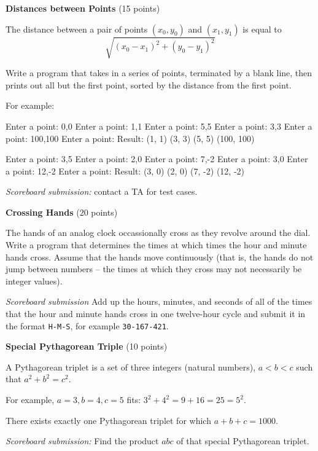 \documentclass[11pt]{cselabheader}
\theoremstyle{plain}
\begin{document}
\begin{prob}[distances.py]
    \textbf{Distances between Points} (15 points)

    The distance between a pair of points $(x_0, y_0)$ and $(x_1, y_1)$ is
    equal to $$\sqrt{(x_0 - x_1)^2 + (y_0 - y_1)^2}$$
    
    Write a program that takes in a series of points, terminated by a blank
    line, then prints out all but the first point, sorted by the distance from
    the first point.
    
    For example:
    
    \begin{verbatimcode}
Enter a point: 0,0
Enter a point: 1,1
Enter a point: 5,5
Enter a point: 3,3
Enter a point: 100,100
Enter a point:
Result: (1, 1) (3, 3) (5, 5) (100, 100)
    \end{verbatimcode}
    
    \begin{verbatimcode}
Enter a point: 3,5
Enter a point: 2,0
Enter a point: 7,-2
Enter a point: 3,0
Enter a point: 12,-2
Enter a point: 
Result: (3, 0) (2, 0) (7, -2) (12, -2)
    \end{verbatimcode}
    
    \textit{Scoreboard submission:} contact a TA for test cases.
\end{prob}


\begin{prob}[hands.py]
    \textbf{Crossing Hands} (20 points)


    The hands of an analog clock occassionally cross as they revolve around
    the dial. Write a program that determines the times at which times the 
    hour and minute hands cross. Assume that
    the hands move continuously (that is, the hands do not jump between
    numbers -- the times at which they cross may not necessarily be
    integer values).

    \textit{Scoreboard submission} Add up the hours, minutes, and seconds
    of all of the times that the hour and minute hands cross in one
    twelve-hour cycle and submit it in the format \texttt{H-M-S}, 
    for example \texttt{30-167-421}.
\end{prob}


\begin{prob}[pythagoras.py]
    \textbf{Special Pythagorean Triple} (10 points)

    A Pythagorean triplet is a set of three integers (natural numbers), $a
    < b < c$ such that $a^2 + b^2 = c^2$.

    For example, $a = 3, b = 4, c = 5$ fits: $3^2 + 4^2 = 9 + 16 = 25 =
    5^2$.

    There exists exactly one Pythagorean triplet for which $a + b + c =
    1000$.

    \textit{Scoreboard submission:} Find the product $abc$ of that special
    Pythagorean triplet.
\end{prob}
\end{document}
